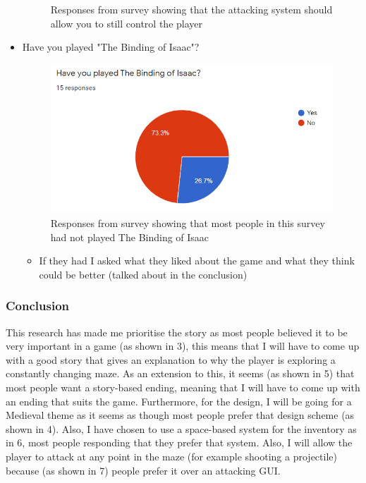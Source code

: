 \documentclass{article}
\begin{document}
\begin{itemize}
\begin{figure}[hbt!]
                        \caption{Responses from survey showing that the attacking system should allow you to still control the player}
                        \label{fig}
                    \end{figure}
                    \item Have you played "The Binding of Isaac"?
                    \begin{figure}[hbt!]
                        \centerline{\includegraphics[scale=1]{img/Capture.PNG}}
                        \caption{Responses from survey showing that most people in this survey had not played The Binding of Isaac}
                        \label{fig}
                    \end{figure}
                    \begin{itemize}
                        \item If they had I asked what they liked about the game and what they think could be better (talked about in the conclusion)
                    \end{itemize}
                \end{itemize}
        \subsubsection{Conclusion}
            This research has made me prioritise the story as most people believed it to be very important in a game (as shown in \figurename{ 3}), this means that I will have to come up with a good story that gives an explanation to why the player is exploring a constantly changing maze. As an extension to this, it seems (as shown in \figurename{ 5}) that most people want a story-based ending, meaning that I will have to come up with an ending that suits the game. Furthermore, for the design, I will be going for a Medieval theme as it seems as though most people prefer that design scheme (as shown in \figurename{ 4}). Also, I have chosen to use a space-based system for the inventory as in \figurename{ 6}, most people responding that they prefer that system. Also, I will allow the player to attack at any point in the maze (for example shooting a projectile) because (as shown in \figurename{ 7}) people prefer it over an attacking GUI.
\end{document}
